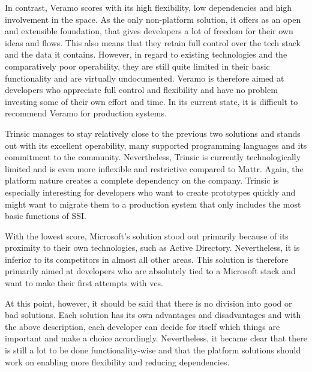     In contrast, Veramo scores with its high flexibility, low dependencies and high involvement in the space. As the only non-platform solution, it offers as an open and extensible foundation, that gives developers a lot of freedom for their own ideas and flows. This also means that they retain full control over the tech stack and the data it contains. However, in regard to existing technologies and the comparatively poor operability, they are still quite limited in their basic functionality and are virtually undocumented. Veramo is therefore aimed at developers who appreciate full control and flexibility and have no problem investing some of their own effort and time. In its current state, it is difficult to recommend Veramo for production systems.

    Trinsic manages to stay relatively close to the previous two solutions and stands out with its excellent operability, many supported programming languages and its commitment to the community. Nevertheless, Trinsic is currently technologically limited and is even more inflexible and restrictive compared to Mattr. Again, the platform nature creates a complete dependency on the company. Trinsic is especially interesting for developers who want to create prototypes quickly and might want to migrate them to a production system that only includes the most basic functions of \ac{SSI}.
    
    With the lowest score, Microsoft's solution stood out primarily because of its proximity to their own technologies, such as Active Directory. Nevertheless, it is inferior to its competitors in almost all other areas. This solution is therefore primarily aimed at developers who are absolutely tied to a Microsoft stack and want to make their first attempts with \acp{vc}.
    
    At this point, however, it should be said that there is no division into good or bad solutions. Each solution has its own advantages and disadvantages and with the above description, each developer can decide for itself which things are important and make a choice accordingly. Nevertheless, it became clear that there is still a lot to be done functionality-wise and that the platform solutions should work on enabling more flexibility and reducing dependencies. 
	
	
	
	